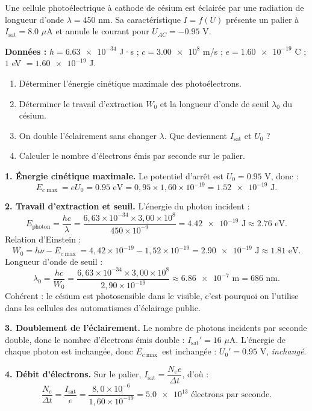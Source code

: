 \documentclass[11pt]{article}
\begin{document}
\begin{exoresolu}
Une cellule photoélectrique à cathode de césium est éclairée par une radiation de longueur d'onde $\lambda = \num{450}$ nm. Sa caractéristique $I = f(U)$ présente un palier à $I_{\text{sat}} = \num{8,0}$ $\mu$A et annule le courant pour $U_{AC} = -\num{0,95}$ V.

\textbf{Données :} $h = \num{6,63e-34}$ J·s ; $c = \num{3,00e8}$ m/s ; $e = \num{1,60e-19}$ C ; $\num{1}$ eV $= \num{1,60e-19}$ J.

\begin{enumerate}
\item Déterminer l'énergie cinétique maximale des photoélectrons.
\item Déterminer le travail d'extraction $W_0$ et la longueur d'onde de seuil $\lambda_0$ du césium.
\item On double l'éclairement sans changer $\lambda$. Que deviennent $I_{\text{sat}}$ et $U_0$ ?
\item Calculer le nombre d'électrons émis par seconde sur le palier.
\end{enumerate}

\tcblower

\textbf{1. Énergie cinétique maximale.} Le potentiel d'arrêt est $U_0 = \num{0,95}$ V, donc :
\[ E_{c\max} = eU_0 = \num{0,95} \text{ eV} = 0,95 \times 1,60 \times 10^{-19} = \num{1,52e-19} \text{ J}. \]

\textbf{2. Travail d'extraction et seuil.} L'énergie du photon incident :
\[ E_{\text{photon}} = \frac{hc}{\lambda} = \frac{6,63 \times 10^{-34} \times 3,00 \times 10^{8}}{450 \times 10^{-9}} = \num{4,42e-19} \text{ J} \approx \num{2,76} \text{ eV}. \]
Relation d'Einstein :
\[ W_0 = h\nu - E_{c\max} = 4,42 \times 10^{-19} - 1,52 \times 10^{-19} = \num{2,90e-19} \text{ J} \approx \num{1,81} \text{ eV}. \]
Longueur d'onde de seuil :
\[ \lambda_0 = \frac{hc}{W_0} = \frac{6,63 \times 10^{-34} \times 3,00 \times 10^{8}}{2,90 \times 10^{-19}} \approx \num{6,86e-7} \text{ m} = \num{686} \text{ nm}. \]
Cohérent : le césium est photosensible dans le visible, c'est pourquoi on l'utilise dans les cellules des automatismes d'éclairage public.

\textbf{3. Doublement de l'éclairement.} Le nombre de photons incidents par seconde double, donc le nombre d'électrons émis double : $I_{\text{sat}}' = \num{16}$ $\mu$A. L'énergie de chaque photon est inchangée, donc $E_{c\max}$ est inchangée : $U_0' = \num{0,95}$ V, \emph{inchangé}.

\textbf{4. Débit d'électrons.} Sur le palier, $I_{\text{sat}} = \dfrac{N_e e}{\Delta t}$, d'où :
\[ \frac{N_e}{\Delta t} = \frac{I_{\text{sat}}}{e} = \frac{8,0 \times 10^{-6}}{1,60 \times 10^{-19}} = \num{5,0e13} \text{ électrons par seconde}. \]
\end{exoresolu}
\end{document}

